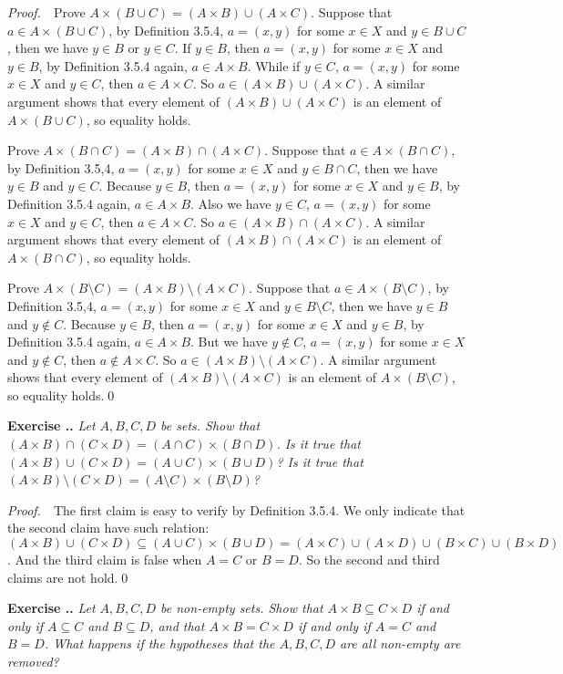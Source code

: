 \documentclass{book}
\newcommand{\pff}{\vspace{.25em}\noindent\emph{Proof.}~~}
\newcounter{Exercise}[section]
\renewcommand{\theExercise}{\thesection.\arabic{Exercise}.}
\newcommand{\new}{\vspace{1.5em}\noindent\textbf{{Exercise \stepcounter{Exercise}\textbf{\theExercise}}} }
\begin{document}
\pff Prove $A\times(B\cup C)=(A\times B)\cup(A\times C)$. Suppose that $a\in A\times(B\cup C)$, by Definition 3.5.4, $a=(x,y)$ for some $x\in X$ and $y\in B\cup C$, then we have $y\in B$ or $y\in C$. If $y\in B$, then $a=(x,y)$ for some $x\in X$ and $y\in B$, by Definition 3.5.4 again, $a\in A\times B$. While if $y\in C$, $a=(x,y)$ for some $x\in X$ and $y\in C$, then $a\in A\times C$. So $a\in(A\times B)\cup(A\times C)$. A similar argument shows that every element of $(A\times B)\cup(A\times C)$ is an element of $A\times(B\cup C)$, so equality holds.

Prove $A\times(B\cap C)=(A\times B)\cap (A\times C)$. Suppose that $a\in A\times(B\cap C)$, by Definition 3.5,4, $a=(x,y)$ for some $x\in X$ and $y\in B\cap C$, then we have $y\in B$ and $y\in C$. Because $y\in B$, then $a=(x,y)$ for some $x\in X$ and $y\in B$, by Definition 3.5.4 again, $a\in A\times B$. Also we have $y\in C$, $a=(x,y)$ for some $x\in X$ and $y\in C$, then $a\in A\times C$. So $a\in(A\times B)\cap(A\times C)$. A similar argument shows that every element of $(A\times B)\cap(A\times C)$ is an element of $A\times(B\cap C)$, so equality holds.

Prove $A\times(B\setminus C)=(A\times B)\setminus (A\times C)$. Suppose that $a\in A\times(B\setminus C)$, by Definition 3.5,4, $a=(x,y)$ for some $x\in X$ and $y\in B\setminus C$, then we have $y\in B$ and $y\notin C$. Because $y\in B$, then $a=(x,y)$ for some $x\in X$ and $y\in B$, by Definition 3.5.4 again, $a\in A\times B$. But we have $y\notin C$, $a=(x,y)$ for some $x\in X$ and $y\notin C$, then $a\notin A\times C$. So $a\in(A\times B)\setminus(A\times C)$. A similar argument shows that every element of $(A\times B)\setminus(A\times C)$ is an element of $A\times(B\setminus C)$, so equality holds.\qed

\new\emph{Let $A,B,C,D$ be sets. Show that $(A\times B)\cap(C\times D)=(A\cap C)\times(B\cap D)$. Is it true that $(A\times B)\cup(C\times D)=(A\cup C)\times(B\cup D)$? Is it true that $(A\times B)\setminus(C\times D)=(A\setminus C)\times(B\setminus D)$?}

\pff The first claim is easy to verify by Definition 3.5.4. We only indicate that the second claim have such relation: $(A\times B)\cup (C\times D)\subseteq(A\cup C)\times(B\cup D)=(A\times C)\cup(A\times D)\cup(B\times C)\cup(B\times D)$. And the third claim is false when $A=C$ or $B=D$. So the second and third claims are not hold.\qed

\new\emph{Let $A,B,C,D$ be non-empty sets. Show that $A\times B\subseteq  C \times D$ if and only if $A\subseteq  C$ and $B\subseteq D$, and that $A\times B=C\times D$ if and only if $A=C$ and $B=D$. What happens if the hypotheses that the $A,B,C,D$ are all non-empty are removed?}
\end{document}
